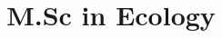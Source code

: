 \documentclass[11pt,a4paper,sans]{moderncv}
\title{M.Sc in Ecology}
\newcommand{\mycvitemPP}[3]{\cvitem{\faCalendarO\hfill{#1}}{{#2}\hfill\faMapMarker\ {#3}}}
\begin{document}
	\makecvtitle
     
     
     
	\nocite{*}
	
     
     
     
     
     
     
     







\end{document}
